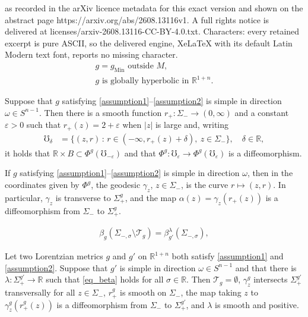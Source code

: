 \documentclass[10pt,a4paper]{amsart}
\def\R{\mathbb R}
\newcommand{\eps}{\varepsilon}
\newcommand{\gm}{g_{\mathrm{Min}}}
\newcommand{\mR}{\mathbb{R}}                    %
\def\mid{\,:\,}
\begin{document}
as recorded in the arXiv licence metadata for this exact version and shown on the abstract page https://arxiv.org/abs/2608.13116v1. A full rights notice is delivered at licenses/arxiv-2608.13116-CC-BY-4.0.txt. Characters: every retained excerpt is pure ASCII, so the delivered engine, XeLaTeX with its default Latin Modern text font, reports no missing character.
\begin{gather}
g = \gm \text{ outside $M$}, \label{assumption1} \\
g \text{ is globally hyperbolic in $\mR^{1+n}$.} \label{assumption2}
\end{gather}

\begin{Lemma}\label{lem_r_plus}
Suppose that $g$ satisfying \eqref{assumption1}--\eqref{assumption2} is simple in direction $\omega \in S^{n-1}$. Then there is a smooth function $r_+ : \Sigma_- \to (0, \infty)$ and a constant $\eps > 0$ such that $r_+(z) = 2 + \eps$ when $|z|$ is large and, writing
    \begin{align*}
\mho_\delta &= \{(z, r) \mid r \in (-\infty, r_+(z) + \delta),\ z \in \Sigma_- \}, \quad \delta \in \R, 
    \end{align*}
it holds that $\R \times B \subset \Phi^g(\mho_{-\eps})$ and that
$\Phi^g : \mho_\eps \to \Phi^g(\mho_\eps)$ is a diffeomorphism.
\end{Lemma}

\begin{Remark}\label{rem_alpha_diffeo}
If $g$ satisfying \eqref{assumption1}--\eqref{assumption2} is simple in direction $\omega$, then in the coordinates given by $\Phi^g$, the geodesic $\gamma_z$, $z \in \Sigma_-$, is the curve $r \mapsto (z, r)$. In particular, $\gamma_z$ is transverse to $\Sigma_+^g$, and the map $\alpha(z) = \gamma_z(r_+(z))$ is a diffeomorphism from $\Sigma_-$ to $\Sigma_+^g$.
\end{Remark}

    \begin{align}\label{eq_beta}
\beta_{g}(\Sigma_{-,\sigma} \setminus \mathcal T_{g})
= 
\beta_{g'}^{\lambda}(\Sigma_{-,\sigma}),
    \end{align}

\begin{Lemma}\label{lem_nontrapping}
Let two Lorentzian metrics $g$ and $g'$ on $\R^{1+n}$ both satisfy \eqref{assumption1} and \eqref{assumption2}. 
Suppose that $g'$ is simple in direction $\omega \in S^{n-1}$ and that there is $\lambda : \Sigma_+^{g'} \to \R$ such that \eqref{eq_beta} holds for all $\sigma \in \R$.
Then 
$\mathcal{T}_{g} = \emptyset$, $\gamma_z^{g}$ intersects $\Sigma_+^{g'}$ transversally for all $z \in \Sigma_-$,
$r_+^{g}$ is smooth on $\Sigma_-$, the map
taking $z$ to $\gamma_z^{g}(r_+^{g}(z))$ is a diffeomorphism from $\Sigma_{-}$ to $\Sigma_{+}^{g'}$, and $\lambda$ is smooth and positive.
\end{Lemma}
\end{document}
